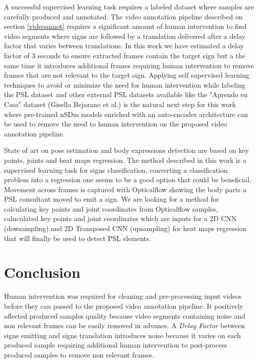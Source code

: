 \documentclass[twocolumn,conference]{article}
\begin{document}
A successful supervised learning task requires a labeled dataset where samples are carefully produced and annotated. The video annotation pipeline described on section \ref{videoannot} requires a significant amount of human intervention to find video segments where signs are followed by a translation delivered after a delay factor that varies between translations. In this work we have estimated a delay factor of 3 seconds to ensure extracted frames contain the target sign but a the same time it introduces additional frames requiring human intervention to remove frames that are not relevant to the target sign. Applying self supervised learning techniques to avoid or minimize the need for human intervention while labeling the PSL dataset and other external PSL datasets available like the "Aprendo en Casa" dataset (Gisella Bejarano et al.) is the natural next step for this work where pre-trained nSDm models enriched with an auto-encoder architecture can be used to remove the need to human intervention on the proposed video annotation pipeline. 

State of art on pose estimation and body expressions detection are based on key points, joints and heat maps regression. The method described in this work is a supervised learning task for signs classification, converting a classification problem into a regression one seems to be a good option that could be beneficial. Movement across frames is captured with Opticalflow showing the body parts a PSL consultant moved to emit a sign. We are looking for a method for calculating key points and joint coordinates from Opticalflow samples, caluculated key points and joint coordinates which are inputs for a 2D CNN (dowsampling) and 2D Transposed CNN (upsampling) for heat maps regression that will finally be used to detect PSL elements.

\section{Conclusion}\label{conclusion}
Human intervention was required for cleaning and pre-processing input videos before they can passed to the proposed video annotation pipeline. It positively affected produced samples quality because video segments containing noise and non relevant frames can be easily removed in advance. A \textit{Delay Factor} between signs emitting and signs translation introduces noise because it varies on each produced sample requiring additional human intervention to post-process produced samples to remove non relevant frames. 
\end{document}
